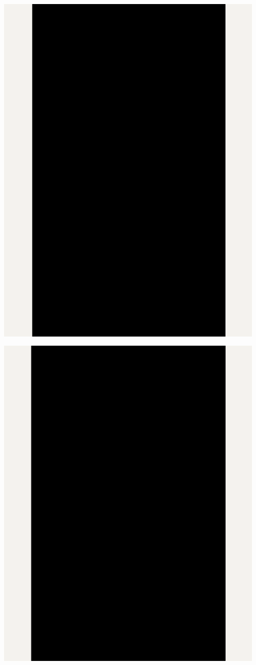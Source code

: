 \Continuing
\begin{center}
    \includegraphics[width=35em]{calltouch-linkedin-p2_public}
\end{center}
\WillContinue
\pagebreak

\Continuing
\begin{center}
    \includegraphics[width=35em]{calltouch-linkedin-p3_public}
\end{center}

\pagebreak
